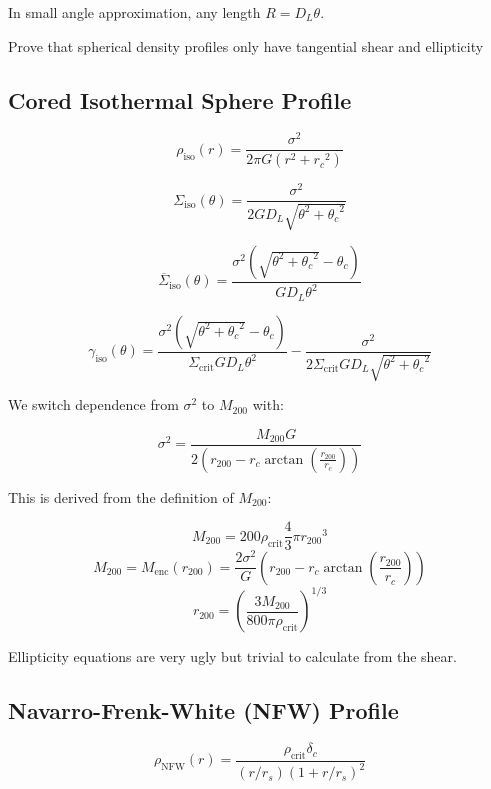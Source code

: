 \documentclass[10pt]{article}
\begin{document}
In small angle approximation, any length $R = D_L \theta$.

Prove that spherical density profiles only have tangential shear and ellipticity


\subsection{Cored Isothermal Sphere Profile}

\[\rho_\mathrm{iso}(r) = \frac{\sigma^2}{2\pi G (r^2 + {r_c}^2)}\]

%
% 

\[\Sigma_\mathrm{iso}(\theta) = \frac{\sigma^2}{2 G D_L \sqrt{\theta^2 + {\theta_c}^2}}\]

\[\overline{\Sigma}_\mathrm{iso}(\theta) = \frac{\sigma^2 \left(\sqrt{\theta^2 + {\theta_c}^2} - \theta_c \right)}{G D_L \theta^2}\]

\[\gamma_\mathrm{iso}(\theta) = \frac{\sigma^2 \left(\sqrt{\theta^2 + {\theta_c}^2} - \theta_c \right)}{\Sigma_\mathrm{crit} G D_L \theta^2} - \frac{\sigma^2}{2 \Sigma_\mathrm{crit} G D_L \sqrt{\theta^2 + {\theta_c}^2}}\]

We switch dependence from $\sigma^2$ to $M_{200}$ with:

\[\sigma^2 = \frac{M_{200} G}{2 \left( r_{200} - r_c \arctan{\left(\frac{r_{200}}{r_c}\right)} \right)}\]

This is derived from the definition of $M_{200}$:

\[M_{200} = 200 \rho_\mathrm{crit} \frac{4}{3} \pi {r_{200}}^3\]
\[M_{200} = M_\mathrm{enc}(r_{200}) = \frac{2 \sigma^2}{G} \left( r_{200} - r_c \arctan{\left(\frac{r_{200}}{r_c}\right)} \right)\]
\[r_{200} = \left( \frac{3 M_{200}}{800 \pi \rho_\mathrm{crit}} \right)^{1/3}\]

Ellipticity equations are very ugly but trivial to calculate from the shear.



\subsection{Navarro-Frenk-White (NFW) Profile}

\[\rho_\mathrm{NFW}(r) = \frac{\rho_\mathrm{crit} \delta_c}{(r/r_s)\left(1 + r/r_s\right)^2}\]

%
%
%
\end{document}
